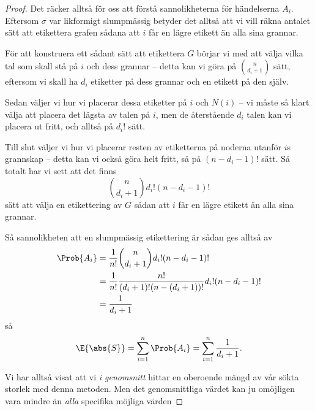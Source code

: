 \documentclass[nobib]{tufte-handout}
\begin{document}
\begin{theorem}
\begin{proof}
        Det räcker alltså för oss att förstå sannolikheterna för händelserna $A_i$. Eftersom $\sigma$ var likformigt slumpmässig betyder det alltså att vi vill räkna antalet sätt att etikettera grafen sådana att $i$ får en lägre etikett än alla sina grannar.

        För att konstruera ett sådant sätt att etikettera $G$ börjar vi med att välja vilka tal som skall stå på $i$ och dess grannar -- detta kan vi göra på $\binom{n}{d_i + 1}$ sätt, eftersom vi skall ha $d_i$ etiketter på dess grannar och en etikett på den själv.

        Sedan väljer vi hur vi placerar dessa etiketter på $i$ och $N(i)$ -- vi måste så klart välja att placera det lägsta av talen på $i$, men de återstående $d_i$ talen kan vi placera ut fritt, och alltså på $d_i!$ sätt.

        Till slut väljer vi hur vi placerar resten av etiketterna på noderna utanför $i$s grannskap -- detta kan vi också göra helt fritt, så på $(n - d_i - 1)!$ sätt. Så totalt har vi sett att det finns
        $$\binom{n}{d_i + 1} d_i! (n - d_i - 1)!$$
        sätt att välja en etikettering av $G$ sådan att $i$ får en lägre etikett än alla sina grannar.

        Så sannolikheten att en slumpmässig etikettering är sådan ges alltså av
        \begin{align*}
            \Prob{A_i} &= \frac{1}{n!}\binom{n}{d_i + 1} d_i! (n - d_i - 1)!\\
            &= \frac{1}{n!}\frac{n!}{(d_i + 1)!(n - (d_i + 1))!}d_i! (n - d_i - 1)!\\
            &= \frac{1}{d_i + 1}
        \end{align*}
        så
        $$\E{\abs{S}} = \sum_{i=1}^{n} \Prob{A_i} = \sum_{i=1}^{n} \frac{1}{d_i + 1}.$$

        Vi har alltså visat att vi \emph{i genomsnitt} hittar en oberoende mängd av vår sökta storlek med denna metoden. Men det genomsnittliga värdet kan ju omöjligen vara mindre än \emph{alla} specifika möjliga värden
\end{proof}
\end{theorem}
\end{document}
